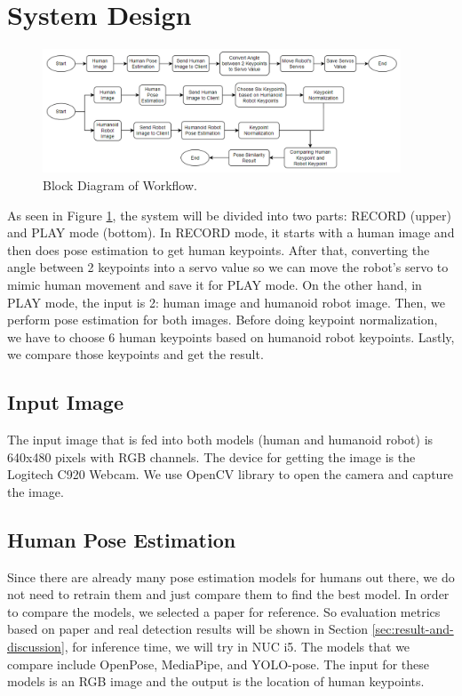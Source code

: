 \section{System Design}
\label{sec:systemdesign}

\begin{figure}[ht]
  \centering
  \includegraphics[width=0.95\textwidth]{gambar/methodology.png}
  \caption{Block Diagram of Workflow.}
  \label{fig:block-diagram}
\end{figure}

As seen in Figure \ref{fig:block-diagram}, the system will be divided into two parts: RECORD (upper) and PLAY mode (bottom).
In RECORD mode, it starts with a human image and then does pose estimation to get human keypoints. After that, converting the angle between 2 keypoints into a servo value
so we can move the robot's servo to mimic human movement and save it for PLAY mode.
On the other hand, in PLAY mode, the input is 2: human image and humanoid robot image. Then, we perform pose estimation for both images. Before doing keypoint normalization,
we have to choose 6 human keypoints based on humanoid robot keypoints. Lastly, we compare those keypoints and get the result.


\subsection{Input Image}
\label{subsec:input-image}

The input image that is fed into both models (human and humanoid robot) is 640x480 pixels with RGB channels. The device for getting the image is the Logitech C920 Webcam. We use OpenCV library to open the camera and capture the image.


\subsection{Human Pose Estimation}
\label{subsec:human-pose-estimation}

Since there are already many pose estimation models for humans out there, we do not need to retrain them and just compare them to find the best model. In order to compare the models, we selected a paper for reference.
So evaluation metrics based on paper and real detection results will be shown in Section \ref{sec:result-and-discussion}, for inference time, we will try in NUC i5. The models that we compare include OpenPose, MediaPipe, and YOLO-pose.
The input for these models is an RGB image and the output is the location of human keypoints.


